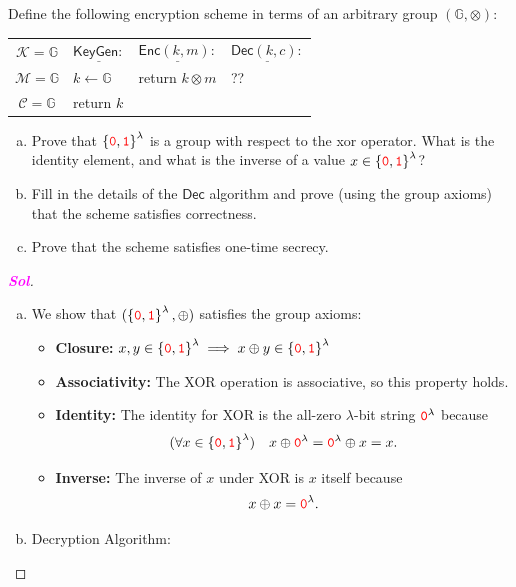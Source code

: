 \documentclass[12pt,openany]{book}
\theoremstyle{definition}
\newcommand{\set}[1]{\left\{#1\right\}}
\newcommand{\G}{\mathbb{G}}
\newcommand{\sol}{\textcolor{magenta}{\bf Sol}}
\newcommand{\KeyGen}{\mathsf{KeyGen}}
\newcommand{\Enc}{\mathsf{Enc}}
\newcommand{\Dec}{\mathsf{Dec}}
\newcommand{\keyspace}{\mathcal{K}}
\newcommand{\messagespace}{\mathcal{M}}
\newcommand{\ciphertextspace}{\mathcal{C}}
\newcommand{\zero}{\textcolor{red}{\texttt{0}}}
\newcommand{\one}{\textcolor{red}{\texttt{1}}}
\newcommand{\tab}{\hspace{8pt}}
\newcommand{\xor}{\oplus}
\newcommand{\binaryfield}{\set{\zero,\one}}
\begin{document}
\begin{itemize}
		Define the following encryption scheme in terms of an arbitrary group \((\G, \otimes)\):
		\begin{center}
			\begin{tabular}{|clll|}
				\hline
				\(\keyspace=\G\) & \(\underline{\KeyGen:}\) & \(\underline{\Enc(k,m):}\) &\(\underline{\Dec(k,c):}\) \\
				\(\messagespace=\G\) & \tab\(k\gets\G\) & \tab return \(k\otimes m\) & \tab ??\\
				\(\ciphertextspace=\G\) & \tab return \(k\) &&\\
				\hline
			\end{tabular}
		\end{center}
		\begin{enumerate}[(a)]
			\item Prove that \(\binaryfield^\lambda\) is a group with respect to the xor operator. What is the identity
			element, and what is the inverse of a value $x\in\binaryfield^\lambda$?
			\item Fill in the details of the $\Dec$ algorithm and prove (using the group axioms) that the scheme satisfies correctness.
			\item Prove that the scheme satisfies one-time secrecy.
		\end{enumerate}
		\begin{tcolorbox}[colframe=magenta, breakable, enhanced]
			\begin{proof}[\sol]
				\begin{enumerate}[(a)]
					\item We show that \((\binaryfield^\lambda,\xor)\) satisfies the group axioms:
					\begin{itemize}
						\item[] \textbf{Closure:} \(x,y\in\binaryfield^\lambda\implies x\xor y\in\binaryfield^\lambda\)
						\item[] \textbf{Associativity:} The XOR operation is associative, so this property holds.
						\item[] \textbf{Identity:} The identity for XOR is the all-zero \(\lambda\)-bit string \(\zero^\lambda\) because \[
						(\forall x\in\binaryfield^\lambda)\quad x\xor\zero^\lambda=\zero^\lambda\xor x= x.
						\]
						\item[] \textbf{Inverse:} The inverse of $x$ under XOR is $x$ itself because \[
						x\xor x=\zero^\lambda.
						\]
					\end{itemize}
					\vspace{4pt}
					\item Decryption Algorithm: \begin{center}

\end{center}
\end{enumerate}
\end{proof}
\end{tcolorbox}
\end{itemize}
\end{document}
